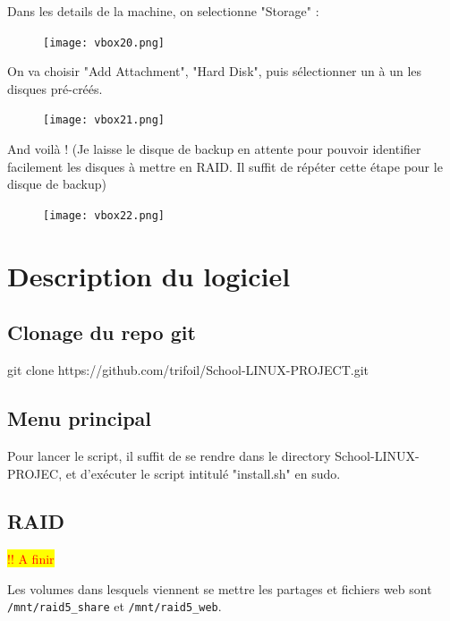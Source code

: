 \documentclass{article}
\begin{document}
Dans les details de la machine, on selectionne "Storage" :

\begin{figure}[h!]
		\centering
		\texttt{[image: vbox20.png]}
\end{figure}


\pagebreak

On va choisir "Add Attachment", "Hard Disk", puis sélectionner un à un les disques pré-créés.

\begin{figure}[h!]
		\centering
		\texttt{[image: vbox21.png]}
\end{figure}

And voilà ! (Je laisse le disque de backup en attente pour pouvoir identifier facilement les disques à mettre en RAID. Il suffit de répéter cette étape pour le disque de backup)

\begin{figure}[h!]
		\centering
		\texttt{[image: vbox22.png]}
\end{figure}


\pagebreak


\pagebreak

\section{Description du logiciel}

\subsection{Clonage du repo git}

git clone https://github.com/trifoil/School-LINUX-PROJECT.git


\subsection{Menu principal}

Pour lancer le script, il suffit de se rendre dans le directory School-LINUX-PROJEC, et d'exécuter le script intitulé "install.sh" en sudo.

\subsection{RAID}

	\colorbox{yellow}{\textcolor{red}{!! A finir}}
	

Les volumes dans lesquels viennent se mettre les partages et fichiers web sont \texttt{/mnt/raid5\_share} et \texttt{/mnt/raid5\_web}.
\end{document}
